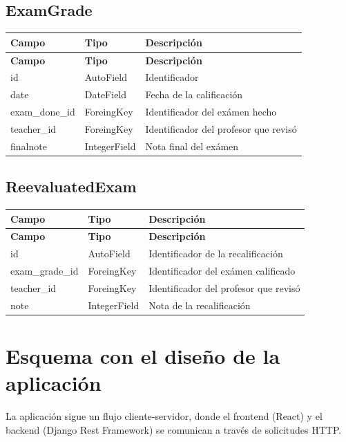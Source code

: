 \documentclass[a4paper,12pt]{article}
\begin{document}
\subsection{ExamGrade}
\begin{longtable}{| p{3cm} | p{3cm}|p{10cm}|}
	\hline
	\textbf{Campo} & \textbf{Tipo} & \textbf{Descripción} \\
	\hline
	\endfirsthead
	\hline
	\textbf{Campo} & \textbf{Tipo} & \textbf{Descripción} \\
	\hline
	\endhead
	\hline
	\endfoot
	\hline
	\endlastfoot
	
	id & AutoField & Identificador  \\
	\hline
	date & DateField & Fecha de la calificación\\
	\hline
	exam\_done\_id & ForeingKey & Identificador del exámen hecho \\
	\hline
	teacher\_id & ForeingKey & Identificador del profesor que revisó \\
	\hline
	finalnote & IntegerField & Nota final del exámen \\
	
	\hline
\end{longtable}

\subsection{ReevaluatedExam}
\begin{longtable}{| p{3cm} | p{3cm}|p{10cm}|}
	\hline
	\textbf{Campo} & \textbf{Tipo} & \textbf{Descripción} \\
	\hline
	\endfirsthead
	\hline
	\textbf{Campo} & \textbf{Tipo} & \textbf{Descripción} \\
	\hline
	\endhead
	\hline
	\endfoot
	\hline
	\endlastfoot
	
	id & AutoField & Identificador de la recalificación  \\
	\hline
	exam\_grade\_id & ForeingKey & Identificador del exámen calificado \\
	\hline
	teacher\_id & ForeingKey & Identificador del profesor que revisó \\
	\hline
	note & IntegerField & Nota de la recalificación\\
	
	\hline
\end{longtable}



\section{Esquema con el diseño de la aplicación}
La aplicación sigue un flujo cliente-servidor, donde el frontend (React) y el backend (Django Rest
Framework) se comunican a través de solicitudes HTTP.
\newline
\end{document}
